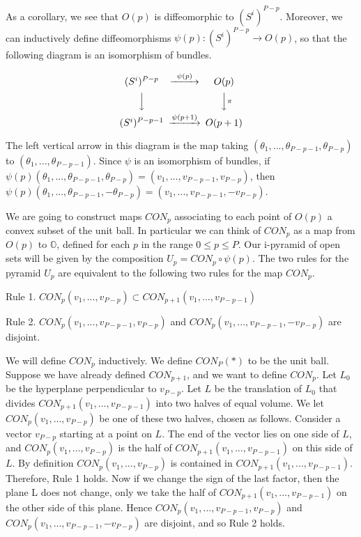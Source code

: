 \documentclass{amsart}
\newtheorem*{Theorem 1}{Theorem 1}
\newtheorem*{Theorem 2}{Theorem 2}
\newtheorem*{Theorem 1A}{Theorem 1A}
\newtheorem*{Theorem 2A}{Theorem 2A}
\newtheorem*{vanishing lemma}{Vanishing Lemma}
\numberwithin{equation}{section}
\begin{document}
As a corollary, we see that $O(p)$ is diffeomorphic to
$(S^i)^{P-p}$.  Moreover, we can inductively define
diffeomorphisms $\psi(p): (S^i)^{P-p} \rightarrow O(p)$, so
that the following diagram is an isomorphism of bundles.

\[
\begin{CD}
(S^i)^{P-p} @>\psi(p)>> O(p) \\
@VVV @VV\pi V \\
(S^i)^{P-p-1} @>\psi(p+1)>> O(p+1)
\end{CD}
\]

The left vertical arrow in this diagram is the map taking
$(\theta_1, ..., \theta_{P-p-1}, \theta_{P-p})$ to $(\theta_1,
..., \theta_{P-p-1})$. Since $\psi$ is an isomorphism of bundles,
if $\psi(p)(\theta_1, ...,
\theta_{P-p-1}, \theta_{P-p}) = (v_1, ..., v_{P-p-1},
v_{P-p})$, then $\psi(p)(\theta_1, ...,
\theta_{P-p-1}, - \theta_{P-p}) = (v_1, ..., v_{P-p-1},
- v_{P-p})$.

We are going to construct maps $CON_p$ associating to each point
of $O(p)$ a convex subset of the unit ball.  In particular we can
think of $CON_p$ as a map from $O(p)$ to $\mathbb{O}$, defined
for each $p$ in the range $0 \le p \le P$.  Our i-pyramid of open
sets will be given by the composition $U_p = CON_p \circ
\psi(p)$.  The two rules for the pyramid $U_p$ are equivalent to
the following two rules for the map $CON_p$.

Rule 1. $CON_p(v_1, ..., v_{P-p}) \subset CON_{p+1}(v_1, ...,
v_{P-p-1})$

Rule 2. $CON_p(v_1, ..., v_{P-p-1}, v_{P-p})$ and $CON_p(v_1,
..., v_{P-p-1}, - v_{P-p})$ are disjoint.

We will define $CON_p$ inductively.  We define $CON_P(*)$ to be
the unit ball.  Suppose we have already defined $CON_{p+1}$, and
we want to define $CON_p$.  Let
$L_0$ be the hyperplane perpendicular to $v_{P-p}$.  Let $L$ be
the translation of $L_0$ that divides $CON_{p+1}(v_1, ...,
v_{P-p-1})$ into two halves of equal volume.  We let $CON_p(v_1,
..., v_{P-p})$ be one of these two halves, chosen as follows. 
Consider a vector $v_{P-p}$ starting at a point on $L$.  The end
of the vector lies on one side of $L$, and $CON_p(v_1, ...,
v_{P-p})$ is the half of $CON_{p+1}(v_1, ..., v_{P-p-1})$ on this
side of $L$.  By definition $CON_p(v_1, ..., v_{P-p})$ is
contained in $CON_{p+1}(v_1, ..., v_{P-p-1})$.  Therefore,
Rule 1 holds.  Now if we change the sign of the last factor,
then the plane L does not change, only we take the half of
$CON_{p+1}(v_1, ..., v_{P-p-1})$ on the other side of this plane.
Hence $CON_p(v_1, ..., v_{P-p-1}, v_{P-p})$ and $CON_p(v_1, ...,
v_{P-p-1}, - v_{P-p})$ are disjoint, and so Rule 2 holds.
\end{document}
